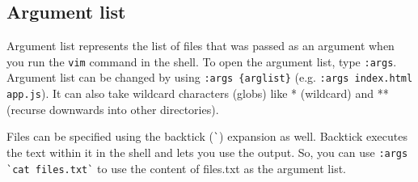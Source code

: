 \subsection{Argument list}

Argument list represents the list of files that was passed as an argument when you run the \verb|vim| command in the shell.
To open the argument list, type \verb|:args|.
Argument list can be changed by using \verb|:args {arglist}| (e.g. \verb|:args index.html app.js|).
It can also take wildcard characters (globs) like * (wildcard) and ** (recurse downwards into other directories).

Files can be specified using the backtick (\verb|`|) expansion as well.
Backtick executes the text within it in the shell and lets you use the output.
So, you can use \verb|:args `cat files.txt`| to use the content of files.txt as the argument list.
